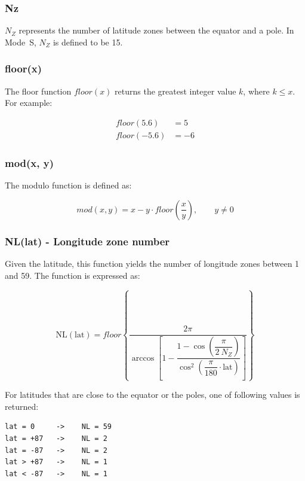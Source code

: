 \subsubsection{Nz}

$N_Z$ represents the number of latitude zones between the equator and a pole. In Mode~S, $N_Z$ is defined to be 15.

\subsubsection{floor(x)}

The floor function $floor(x)$ returns the greatest integer value $k$, where $k \le x$. For example:

\begin{equation}
  \begin{split}
    floor(5.6) &= 5 \\
    floor(-5.6) &= -6
  \end{split}
\end{equation}

\subsubsection{mod(x, y)}

The modulo function is defined as:

\begin{equation}
  mod(x,y) = x - y \cdot floor \left( \frac{x}{y} \right), \qquad y \ne 0
\end{equation}

\subsubsection{NL(lat) - Longitude zone number}

Given the latitude, this function yields the number of longitude zones between 1 and 59. The function is expressed as:

\begin{equation}
  \mathrm{NL}(\mathrm{lat}) = floor \left\{ \dfrac{2 \pi}{\arccos \left[ 1 - \dfrac{1-\cos \left( \dfrac{\pi}{2~N_Z} \right)}{\cos^2\left(\dfrac{\pi}{180} \cdot \mathrm{lat} \right)} \right] } \right\}
\end{equation}

For latitudes that are close to the equator or the poles, one of following values is returned:

\begin{verbatim}
lat = 0     ->    NL = 59
lat = +87   ->    NL = 2
lat = -87   ->    NL = 2
lat > +87   ->    NL = 1
lat < -87   ->    NL = 1
\end{verbatim}


